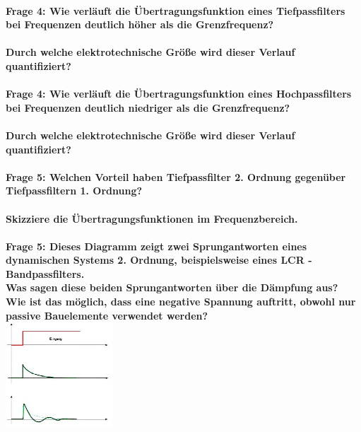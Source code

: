 \documentclass[11pt,a4paper]{scrartcl}
\begin{document}
\\
\textbf{Frage 4: Wie verläuft die Übertragungsfunktion eines Tiefpassfilters bei Frequenzen deutlich höher als die Grenzfrequenz?}\\
\\
\textbf{Durch welche elektrotechnische Größe wird dieser Verlauf quantifiziert?}\\
\\
\textbf{Frage 4: Wie verläuft die Übertragungsfunktion eines Hochpassfilters bei Frequenzen deutlich niedriger als die Grenzfrequenz?}\\
\\
\textbf{Durch welche elektrotechnische Größe wird dieser Verlauf quantifiziert?}\\
\\
\textbf{Frage 5: Welchen Vorteil haben Tiefpassfilter 2. Ordnung gegenüber Tiefpassfiltern 1. Ordnung?}\\
\\
\textbf{Skizziere die Übertragungsfunktionen im Frequenzbereich.}\\
\\
\textbf{Frage 5: Dieses Diagramm zeigt zwei Sprungantworten eines dynamischen Systems 2. Ordnung, beispielsweise eines LCR - Bandpassfilters.\\
Was sagen diese beiden Sprungantworten über die Dämpfung aus? \\
Wie ist das möglich, dass eine negative Spannung auftritt, obwohl nur passive Bauelemente verwendet werden?}\\
\includegraphics[width=4cm,keepaspectratio]{sprungantwort.jpg}\\
\\
\end{document}
